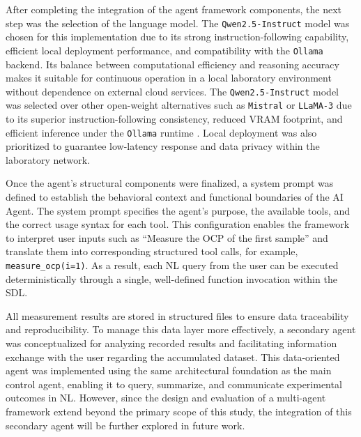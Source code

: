 After completing the integration of the agent framework components, the next step was the selection of the language model. The \texttt{Qwen2.5-Instruct} model \cite{qwen_qwen2.5-7B-Instruct, qwen2.5_blog} was chosen for this implementation due to its strong instruction-following capability, efficient local deployment performance, and compatibility with the \texttt{Ollama} backend. Its balance between computational efficiency and reasoning accuracy makes it suitable for continuous operation in a local laboratory environment without dependence on external cloud services. The \texttt{Qwen2.5-Instruct} model was selected over other open-weight alternatives such as \texttt{Mistral} or \texttt{LLaMA-3} due to its superior instruction-following consistency, reduced VRAM footprint, and efficient inference under the \texttt{Ollama} runtime \cite{liduos_open_source_ai_models_2025}.
Local deployment was also prioritized to guarantee low-latency response and data privacy within the laboratory network.


Once the agent’s structural components were finalized, a system prompt was defined to establish the behavioral context and functional boundaries of the AI Agent. The system prompt specifies the agent’s purpose, the available tools, and the correct usage syntax for each tool. This configuration enables the framework to interpret user inputs such as “Measure the OCP of the first sample” and translate them into corresponding structured tool calls, for example, \texttt{measure\_ocp(i=1)}. As a result, each NL query from the user can be executed deterministically through a single, well-defined function invocation within the SDL.

All measurement results are stored in structured files to ensure data traceability and reproducibility. To manage this data layer more effectively, a secondary agent was conceptualized for analyzing recorded results and facilitating information exchange with the user regarding the accumulated dataset. This data-oriented agent was implemented using the same architectural foundation as the main control agent, enabling it to query, summarize, and communicate experimental outcomes in NL. However, since the design and evaluation of a multi-agent framework extend beyond the primary scope of this study, the integration of this secondary agent will be further explored in future work.

